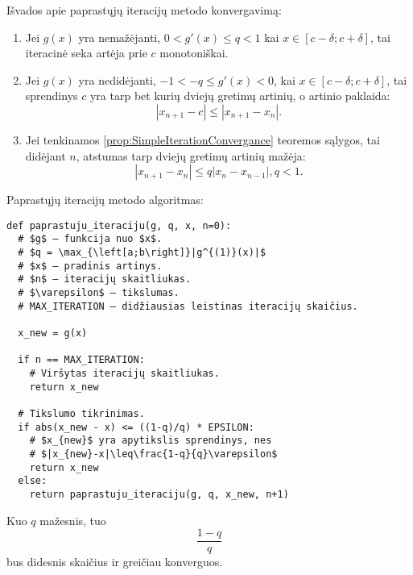 
Išvados apie paprastųjų iteracijų metodo konvergavimą:
\begin{enumerate}
  \item Jei $g(x)$ yra nemažėjanti, $0 < g'(x) \leq q < 1$ kai
    $x \in \left[ c - \delta; c + \delta \right]$, tai iteracinė seka artėja
    prie $c$ monotoniškai.
  \item Jei $g(x)$ yra nedidėjanti, $-1 < -q \leq g'(x) < 0$, kai
    $x \in \left[ c - \delta; c + \delta \right]$, tai sprendinys $c$ yra
    tarp bet kurių dviejų gretimų artinių, o artinio paklaida:
    \begin{equation*}
      |x_{n+1} - c| \leq |x_{n+1} - x_{n}|.
    \end{equation*}
  \item Jei tenkinamos \ref{prop:SimpleIterationConvergance} teoremos
    sąlygos, tai didėjant $n$, atstumas tarp dviejų gretimų artinių
    mažėja:
    \begin{equation*}
      |x_{n+1} - x_{n}| \leq q|x_{n} - x_{n-1}|, q < 1.
    \end{equation*}
\end{enumerate}

Paprastųjų iteracijų metodo algoritmas:
\begin{verbatim}
def paprastuju_iteraciju(g, q, x, n=0):
  # $g$ – funkcija nuo $x$.
  # $q = \max_{\left[a;b\right]}|g^{(1)}(x)|$
  # $x$ – pradinis artinys.
  # $n$ – iteracijų skaitliukas.
  # $\varepsilon$ – tikslumas.
  # MAX_ITERATION – didžiausias leistinas iteracijų skaičius.

  x_new = g(x)

  if n == MAX_ITERATION:
    # Viršytas iteracijų skaitliukas.
    return x_new

  # Tikslumo tikrinimas.
  if abs(x_new - x) <= ((1-q)/q) * EPSILON:
    # $x_{new}$ yra apytikslis sprendinys, nes
    # $|x_{new}-x|\leq\frac{1-q}{q}\varepsilon$
    return x_new
  else:
    return paprastuju_iteraciju(g, q, x_new, n+1)
\end{verbatim}

Kuo $q$ mažesnis, tuo
\begin{equation*}
  \frac{1 - q}{q}
\end{equation*}
bus didesnis skaičius ir greičiau konverguos.



